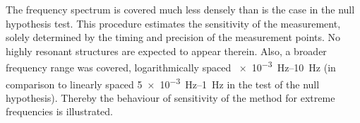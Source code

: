 The frequency spectrum is covered much less densely than is the case in the null hypothesis test. This procedure estimates the sensitivity of the measurement, solely determined by the timing and precision of the measurement points. No highly resonant structures are expected to appear therein.
Also, a broader frequency range was covered, logarithmically spaced \SIrange[range-phrase=--]{e-3}{10}{\hertz} (in comparison to linearly spaced \SIrange[range-phrase=--]{5e-3}{1}{\hertz} in the test of the null hypothesis). Thereby the behaviour of sensitivity of the method for extreme frequencies is illustrated.




